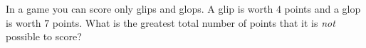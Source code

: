 In a game you can score only glips and glops. A glip is worth $4$ points and a glop is worth $7$ points. What is the greatest total number of points that it is \emph{not} possible to score?
